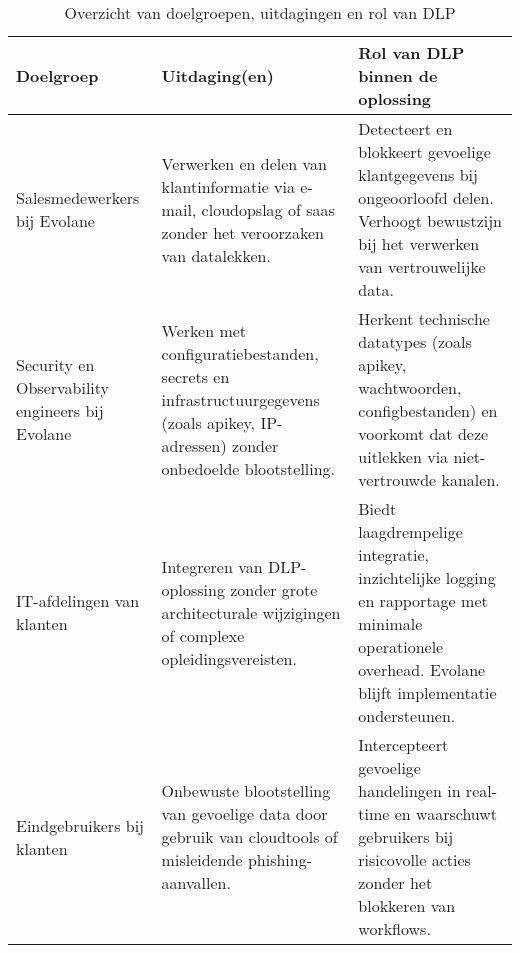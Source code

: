 \begin{table}[h]
    \centering
    \small
    \begin{tabular}{p{4cm} p{5cm} p{6cm}}
        \toprule
        \textbf{Doelgroep} & \textbf{Uitdaging(en)} & \textbf{Rol van DLP binnen de oplossing} \\
        \midrule
        Salesmedewerkers bij Evolane 
        & Verwerken en delen van klantinformatie via e-mail, cloudopslag of \gls{saas} zonder het veroorzaken van datalekken. 
        & Detecteert en blokkeert gevoelige klantgegevens bij ongeoorloofd delen. Verhoogt bewustzijn bij het verwerken van vertrouwelijke data. \\

        Security en Observability engineers bij Evolane 
        & Werken met configuratiebestanden, secrets en infrastructuurgegevens (zoals \gls{apikey}, IP-adressen) zonder onbedoelde blootstelling.
        & Herkent technische datatypes (zoals \gls{apikey}, wachtwoorden, configbestanden) en voorkomt dat deze uitlekken via niet-vertrouwde kanalen. \\

        IT-afdelingen van klanten 
        & Integreren van DLP-oplossing zonder grote architecturale wijzigingen of complexe opleidingsvereisten. 
        & Biedt laagdrempelige integratie, inzichtelijke logging en rapportage met minimale operationele overhead. Evolane blijft implementatie ondersteunen. \\

        Eindgebruikers bij klanten 
        & Onbewuste blootstelling van gevoelige data door gebruik van cloudtools of misleidende phishing-aanvallen. 
        & Intercepteert gevoelige handelingen in real-time en waarschuwt gebruikers bij risicovolle acties zonder het blokkeren van workflows. \\
        \bottomrule
    \end{tabular}
    \caption{Overzicht van doelgroepen, uitdagingen en rol van DLP}
    \label{tab:probleemstelling}
\end{table}


